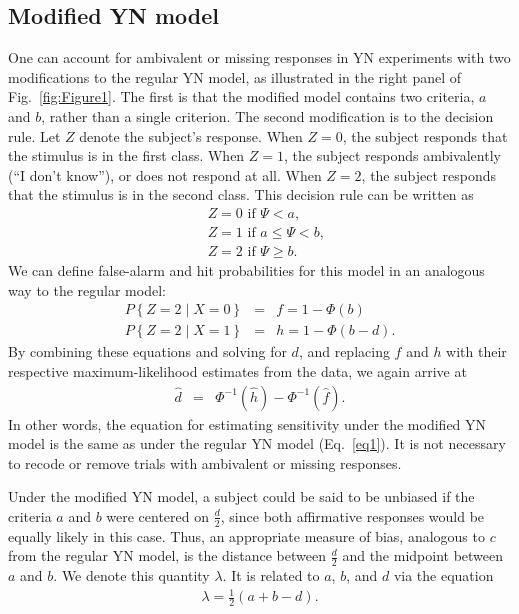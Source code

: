 \documentclass[man]{apa6}
\begin{document}
\subsection{Modified YN model}
One can account for ambivalent or missing responses in YN experiments with two modifications to the regular YN model, as illustrated in the right panel of Fig.~\ref{fig:Figure1}. The first is that the modified model contains two criteria, $a$ and $b$, rather than a single criterion. The second modification is to the decision rule. Let $Z$ denote the subject's response. When $Z=0$, the subject responds that the stimulus is in the first class. When $Z=1$, the subject responds ambivalently (``I don't know''), or does not respond at all. When $Z=2$, the subject responds that the stimulus is in the second class. This decision rule can be written as
\begin{eqnarray*}
&Z=0\textrm{ if }\Psi<a\textrm{,}\\
&Z=1\textrm{ if }a\le\Psi<b\textrm{,}\\
&Z=2\textrm{ if }\Psi\ge{}b\textrm{.}
\end{eqnarray*} 
We can define false-alarm and hit probabilities for this model in an analogous way to the regular model:
\begin{eqnarray*}
P\left\{Z=2\mid{}X=0\right\}&=&f=1-\Phi\left(b\right)\\
P\left\{Z=2\mid{}X=1\right\}&=&h=1-\Phi\left(b-d\right)\textrm{.}
\end{eqnarray*}
By combining these equations and solving for $d$, and replacing $f$ and $h$ with their respective maximum-likelihood estimates from the data, we again arrive at
\begin{eqnarray*}
\hat{d}&=&\Phi^{-1}\left(\hat{h}\right)-\Phi^{-1}\left(\hat{f}\right)\textrm{.}
\end{eqnarray*}In other words, the equation for estimating sensitivity under the modified YN model is the same as under the regular YN model (Eq.~\ref{eq1}). It is not necessary to recode or remove trials with ambivalent or missing responses.

Under the modified YN model, a subject could be said to be unbiased if the criteria $a$ and $b$ were centered on $\frac{d}{2}$, since both affirmative responses would be equally likely in this case. Thus, an appropriate measure of bias, analogous to $c$ from the regular YN model, is the distance between $\frac{d}{2}$ and the midpoint between $a$ and $b$. We denote this quantity $\lambda$. It is related to $a$, $b$, and $d$ via the equation
\begin{eqnarray*}\lambda=\frac{1}{2}\left(a+b-d\right)\textrm{.}\end{eqnarray*}
\end{document}
